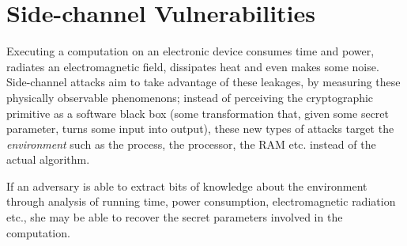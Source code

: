 \section{Side-channel Vulnerabilities}
Executing a computation on an electronic device consumes time and power, radiates an electromagnetic field, dissipates heat and even makes some noise\cite{Gnad_Krautter_Tahoori_2019}. 
Side-channel attacks aim to take advantage of these leakages, by measuring these physically observable phenomenons; instead of perceiving the cryptographic primitive as a software black box (some transformation that, given some secret parameter, turns some input into output), these new types of attacks target the \emph{environment} such as the process, the processor, the RAM etc. instead of the actual algorithm.

If an adversary is able to extract bits of knowledge about the environment through analysis of running time, power consumption, electromagnetic radiation etc., she may be able to recover the secret parameters involved in the computation.


